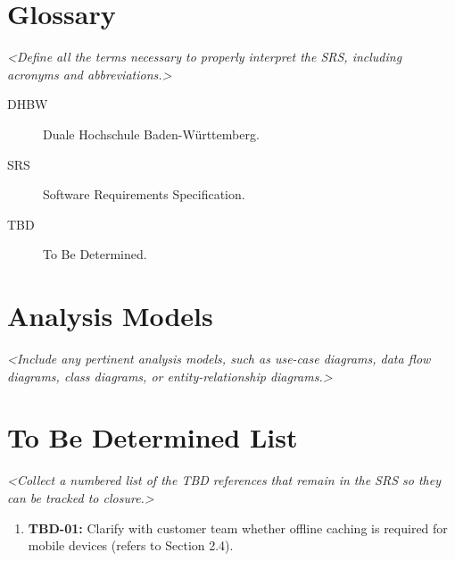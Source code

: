 \documentclass[11pt, a4paper]{article}
\newcommand{\guidance}[1]{\textit{\color{darkgray}<#1>}}
\begin{document}
\section{Glossary}
\guidance{Define all the terms necessary to properly interpret the SRS, including acronyms and abbreviations.}
\begin{description}
    \item[DHBW] Duale Hochschule Baden-Württemberg.
    \item[SRS] Software Requirements Specification.
    \item[TBD] To Be Determined.
\end{description}

\section{Analysis Models}
\guidance{Include any pertinent analysis models, such as use-case diagrams, data flow diagrams, class diagrams, or entity-relationship diagrams.}

\section{To Be Determined List}
\guidance{Collect a numbered list of the TBD references that remain in the SRS so they can be tracked to closure.}
\begin{enumerate}
    \item \textbf{TBD-01:} Clarify with customer team whether offline caching is required for mobile devices (refers to Section 2.4).
\end{enumerate}
\end{document}
